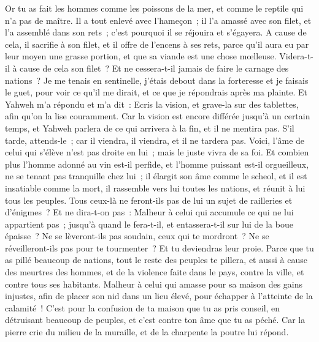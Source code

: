 \begin{multicols}{2}
Or tu as fait les hommes comme les poissons de la mer, et comme le reptile qui n'a pas de maître.
Il a tout enlevé avec l'hameçon~; il l'a amassé avec son filet, et l'a assemblé dans son rets~; c'est pourquoi il se réjouira et s'égayera.
A cause de cela, il sacrifie à son filet, et il offre de l'encens à ses rets, parce qu'il aura eu par leur moyen une grasse portion, et que sa viande est une chose mœlleuse.
Videra-t-il à cause de cela son filet~? Et ne cessera-t-il jamais de faire le carnage des nations~?
\VerseOne{}Je me tenais en sentinelle, j'étais debout dans la forteresse et je faisais le guet, pour voir ce qu'il me dirait, et ce que je répondrais après ma plainte.
Et Yahweh m'a répondu et m'a dit~: Ecris la vision, et grave-la sur des tablettes, afin qu'on la lise couramment.
Car la vision est encore différée jusqu'à un certain temps, et Yahweh parlera de ce qui arrivera à la fin, et il ne mentira pas. S'il tarde, attends-le~; car il viendra, il viendra, et il ne tardera pas.
Voici, l'âme de celui qui s'élève n'est pas droite en lui~; mais le juste vivra de sa foi.
Et combien plus l'homme adonné au vin est-il perfide, et l'homme puissant est-il orgueilleux, ne se tenant pas tranquille chez lui~; il élargit son âme comme le scheol, et il est insatiable comme la mort, il rassemble vers lui toutes les nations, et réunit à lui tous les peuples.
Tous ceux-là ne feront-ils pas de lui un sujet de railleries et d'énigmes~? Et ne dira-t-on pas~: Malheur à celui qui accumule ce qui ne lui appartient pas~; jusqu'à quand le fera-t-il, et entassera-t-il sur lui de la boue épaisse~?
Ne se lèveront-ils pas soudain, ceux qui te mordront~? Ne se réveilleront-ils pas pour te tourmenter~? Et tu deviendras leur proie.
Parce que tu as pillé beaucoup de nations, tout le reste des peuples te pillera, et aussi à cause des meurtres des hommes, et de la violence faite dans le pays, contre la ville, et contre tous ses habitants.
Malheur à celui qui amasse pour sa maison des gains injustes, afin de placer son nid dans un lieu élevé, pour échapper à l'atteinte de la calamité~!
C'est pour la confusion de ta maison que tu as pris conseil, en détruisant beaucoup de peuples, et c'est contre ton âme que tu as péché.
Car la pierre crie du milieu de la muraille, et de la charpente la poutre lui répond.

\end{multicols}
